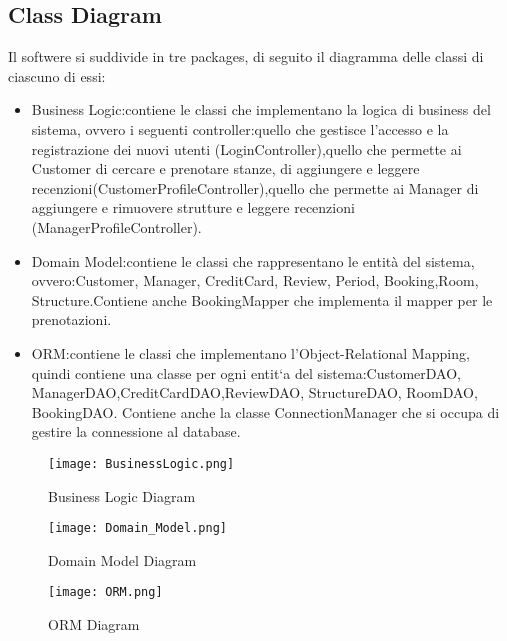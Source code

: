 \documentclass{article}
\begin{document}
\subsection{Class Diagram}
Il softwere si suddivide in tre packages, di seguito il diagramma delle classi di ciascuno di essi:
\begin{itemize}
    \item Business Logic:contiene le classi che implementano la logica di business del sistema, ovvero i seguenti controller:quello che gestisce l’accesso e la registrazione dei nuovi utenti (LoginController),quello che permette ai Customer di cercare e prenotare stanze, di aggiungere e leggere recenzioni(CustomerProfileController),quello che permette ai Manager di aggiungere e rimuovere strutture e leggere recenzioni (ManagerProfileController).
    \item Domain Model:contiene le classi che rappresentano le entità del sistema, ovvero:Customer, Manager, CreditCard, Review, Period, Booking,Room, Structure.Contiene anche BookingMapper che implementa il mapper per le prenotazioni.
    \item ORM:contiene le classi che implementano l’Object-Relational Mapping, quindi contiene una classe per ogni entit`a del sistema:CustomerDAO, ManagerDAO,CreditCardDAO,ReviewDAO, StructureDAO, RoomDAO, BookingDAO. Contiene anche la classe ConnectionManager che si occupa di gestire la connessione al database.
\end{itemize}

\begin{figure}[h!]
    \centering
    \texttt{[image: BusinessLogic.png]}
    \caption{Business Logic Diagram}
    \label{fig:BusinessLogic}
\end{figure}
\begin{figure}[h!]
    \centering
    \texttt{[image: Domain\_Model.png]}
    \caption{Domain Model Diagram}
    \label{fig:DomainModel}
\end{figure}
\begin{figure}[h!]
    \centering
    \texttt{[image: ORM.png]}
    \caption{ORM Diagram}
    \label{fig:ORM}
\end{figure}
\newpage
\end{document}
